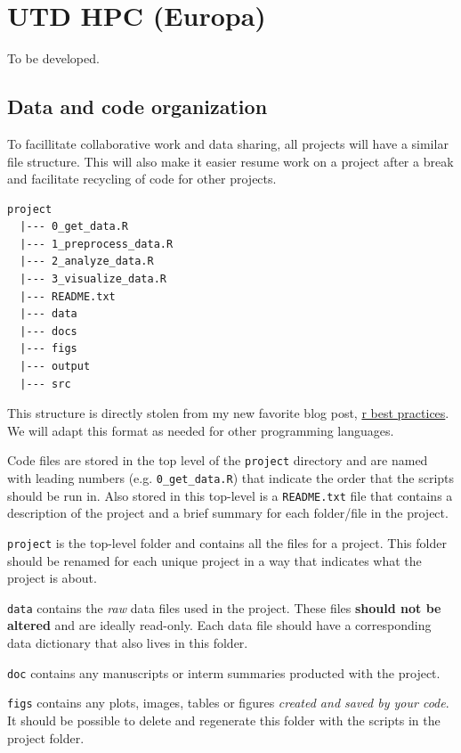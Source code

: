 \documentclass[]{book}
\begin{document}
\hypertarget{utd-hpc-europa}{%
\section{UTD HPC (Europa)}\label{utd-hpc-europa}}

To be developed.

\hypertarget{data-and-code-organization}{%
\subsection{Data and code organization}\label{data-and-code-organization}}

To facillitate collaborative work and data sharing, all projects will have a similar file structure. This will also make it easier resume work on a project after a break and facilitate recycling of code for other projects.

\begin{verbatim}
project 
  |--- 0_get_data.R
  |--- 1_preprocess_data.R
  |--- 2_analyze_data.R
  |--- 3_visualize_data.R
  |--- README.txt
  |--- data
  |--- docs
  |--- figs
  |--- output
  |--- src
\end{verbatim}

This structure is directly stolen from my new favorite blog post, \href{https://kdestasio.github.io/post/r_best_practices/}{r best practices}. We will adapt this format as needed for other programming languages.

Code files are stored in the top level of the \texttt{project} directory and are named with leading numbers (e.g. \texttt{0\_get\_data.R}) that indicate the order that the scripts should be run in. Also stored in this top-level is a \texttt{README.txt} file that contains a description of the project and a brief summary for each folder/file in the project.

\texttt{project} is the top-level folder and contains all the files for a project. This folder should be renamed for each unique project in a way that indicates what the project is about.

\texttt{data} contains the \emph{raw} data files used in the project. These files \textbf{should not be altered} and are ideally read-only. Each data file should have a corresponding data dictionary that also lives in this folder.

\texttt{doc} contains any manuscripts or interm summaries producted with the project.

\texttt{figs} contains any plots, images, tables or figures \emph{created and saved by your code}. It should be possible to delete and regenerate this folder with the scripts in the project folder.
\end{document}
